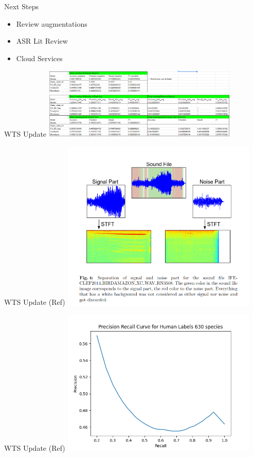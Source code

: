 \begin{frame}{Next Steps}
    \centering
    \begin{itemize}
        \item Review augmentations
        \item ASR Lit Review
        \item Cloud Services
    \end{itemize}
\end{frame}

\begin{frame}{WTS Update}
    \centering
    \includegraphics[height=0.7\textheight,width=0.7\textwidth,keepaspectratio]{images/wts_dl_results.png}
\end{frame}

\begin{frame}{WTS Update (Ref)}
    \centering
    \includegraphics[height=0.7\textheight,width=0.7\textwidth,keepaspectratio]{images/image (15).png}
\end{frame}

\begin{frame}{WTS Update (Ref)}
    \centering
    \includegraphics[height=0.7\textheight,width=0.7\textwidth,keepaspectratio]{images/human_baseline_prec_recall.png}
\end{frame}

